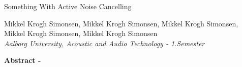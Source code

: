 
\begin{center}
\begin{huge}
Something With Active Noise Cancelling
\end{huge}

\vspace{5mm}
Mikkel Krogh Simonsen, Mikkel Krogh Simonsen, Mikkel Krogh Simonsen, Mikkel Krogh Simonsen, Mikkel Krogh Simonsen
\\
\textit{Aalborg University, Acoustic and Audio Technology - 1.Semester}


\vspace{5mm}

\textbf{Abstract -} \lipsum[2]



\end{center}